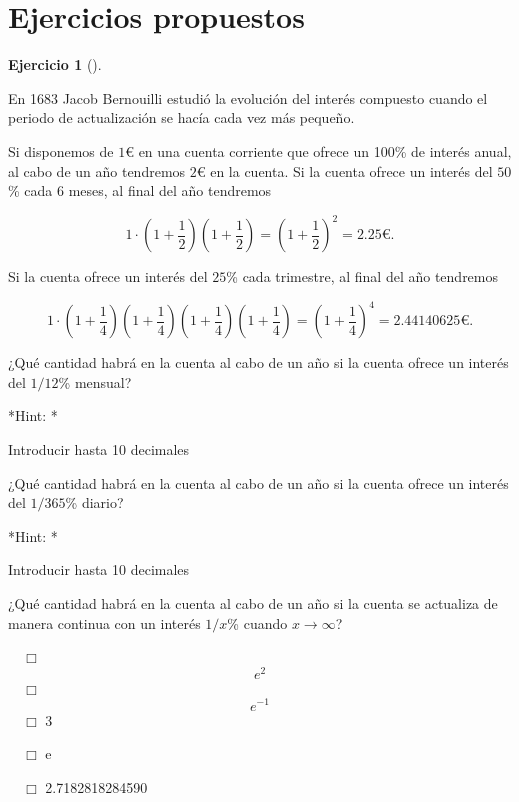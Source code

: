 \documentclass[
  a4paper,
]{scrreport}
\theoremstyle{definition}
\newtheorem{exercise}{Ejercicio}[chapter]
\theoremstyle{remark}
\begin{document}
\hypertarget{ejercicios-propuestos-2}{%
\section{Ejercicios propuestos}\label{ejercicios-propuestos-2}}

\leavevmode{}%
\begin{exercise}[]\label{exr-interes-compuesto}

En 1683 Jacob Bernouilli estudió la evolución del interés compuesto
cuando el periodo de actualización se hacía cada vez más pequeño.

Si disponemos de \(1\)€ en una cuenta corriente que ofrece un 100\% de
interés anual, al cabo de un año tendremos \(2\)€ en la cuenta. Si la
cuenta ofrece un interés del \(50\)\% cada 6 meses, al final del año
tendremos

\[
1\cdot\left(1+\frac{1}{2}\right)\left(1+\frac{1}{2}\right)= \left(1+\frac{1}{2}\right)^2 = 2.25\mbox{€}.
\]

Si la cuenta ofrece un interés del \(25\)\% cada trimestre, al final del
año tendremos

\[
1\cdot\left(1+\frac{1}{4}\right)\left(1+\frac{1}{4}\right)\left(1+\frac{1}{4}\right)\left(1+\frac{1}{4}\right)= \left(1+\frac{1}{4}\right)^4 = 2.44140625\mbox{€}.
\]

¿Qué cantidad habrá en la cuenta al cabo de un año si la cuenta ofrece
un interés del \(1/12\)\% mensual?

\vspace{18pt}*Hint: *

Introducir hasta 10 decimales

¿Qué cantidad habrá en la cuenta al cabo de un año si la cuenta ofrece
un interés del \(1/365\)\% diario?

\vspace{18pt}*Hint: *

Introducir hasta 10 decimales

¿Qué cantidad habrá en la cuenta al cabo de un año si la cuenta se
actualiza de manera continua con un interés \(1/x\)\% cuando
\(x\to\infty\)?

${\quad\Box}$ $$e^2$$
${\quad\Box}$ $$e^{-1}$$
${\quad\Box}$ 3

${\quad\Box}$ e

${\quad\Box}$ 2.7182818284590

\end{exercise}
\end{document}
